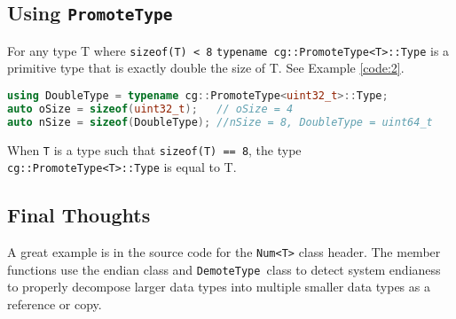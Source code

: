 \documentclass{article}
\newcommand{\theobj}{\protect\Verb+DemoteType +}
\newcommand{\theobjt}{\protect\Verb+PromoteType +}
\begin{document}
\subsection{Using \theobjt}

For any type T where \Verb+sizeof(T) < 8+ \Verb+typename cg::PromoteType<T>::Type+ is a primitive type that is exactly double the size of T. See Example \vref{code:2}.

\begin{lstlisting}[language=C++, label=code:2, caption=Promoting Types]
using DoubleType = typename cg::PromoteType<uint32_t>::Type;
auto oSize = sizeof(uint32_t);   // oSize = 4
auto nSize = sizeof(DoubleType); //nSize = 8, DoubleType = uint64_t
\end{lstlisting}


When \Verb+T+ is a type such that \Verb+sizeof(T) == 8+, the type \Verb+cg::PromoteType<T>::Type+ is equal to T.

\subsection{Final Thoughts}

A great example is in the source code for the \Verb+Num<T>+ class header. The member functions use the endian class and \theobj class to detect system endianess to properly decompose larger data types into multiple smaller data types as a reference or copy.
\end{document}
